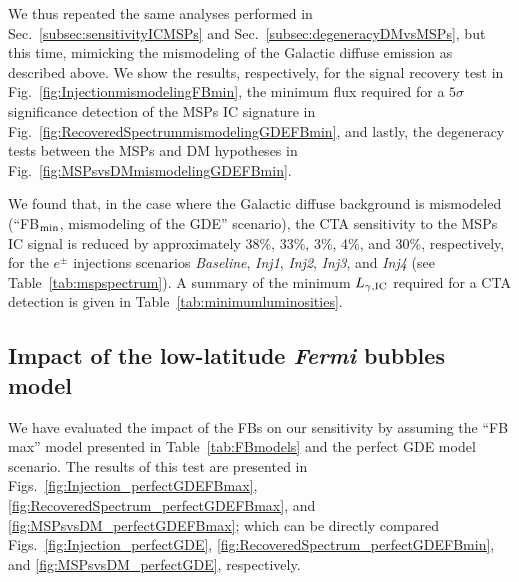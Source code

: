 \documentclass[doublespace,nopageskip]{VTthesis} %
\begin{document}
We thus repeated the same analyses performed in Sec.~\ref{subsec:sensitivityICMSPs} and Sec.~\ref{subsec:degeneracyDMvsMSPs}, but this time, mimicking the mismodeling of the Galactic diffuse emission as described above. We show the results, respectively, for the signal recovery test in Fig.~\ref{fig:InjectionmismodelingFBmin}, the minimum flux required for a $5\sigma$ significance detection of the MSPs IC signature in Fig.~\ref{fig:RecoveredSpectrummismodelingGDEFBmin}, and lastly, the degeneracy tests between the MSPs and DM hypotheses in Fig.~\ref{fig:MSPsvsDMmismodelingGDEFBmin}. 

We found that, in the case where the Galactic diffuse background is mismodeled (``FB$_{\rm min}$, mismodeling of the GDE'' scenario), the CTA sensitivity to the MSPs IC signal is reduced   by approximately 38\%, 33\%, 3\%, 4\%, and 30\%, respectively, for the $e^\pm$ injections scenarios  \textit{Baseline}, \textit{Inj1}, \textit{Inj2}, \textit{Inj3}, and \textit{Inj4} (see Table~\ref{tab:mspspectrum}). A summary of the minimum $L_{\gamma, {\rm IC}}$ required for a CTA detection is given in Table~\ref{tab:minimumluminosities}.

\subsection{Impact of the low-latitude \textit{Fermi} bubbles model}
\label{subsec:FBsImpact}

We have evaluated the impact of the FBs on our sensitivity by assuming the ``FB max'' model presented in Table~\ref{tab:FBmodels} and the perfect GDE model scenario. The results of this test are presented in Figs.~\ref{fig:Injection_perfectGDEFBmax}, \ref{fig:RecoveredSpectrum_perfectGDEFBmax}, and \ref{fig:MSPsvsDM_perfectGDEFBmax}; which can be directly compared Figs.~\ref{fig:Injection_perfectGDE}, \ref{fig:RecoveredSpectrum_perfectGDEFBmin}, and \ref{fig:MSPsvsDM_perfectGDE}, respectively.
 
\end{document}
